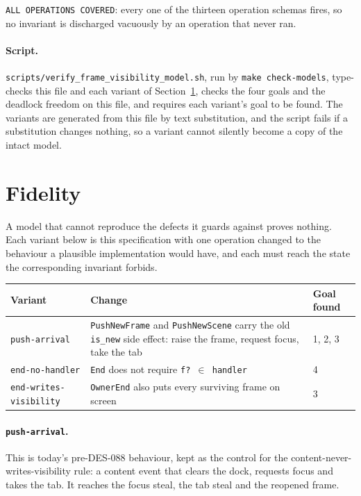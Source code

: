 \documentclass[a4paper,10pt,fleqn]{article}
\begin{document}
\texttt{ALL OPERATIONS COVERED}: every one of the thirteen operation schemas
fires, so no invariant is discharged vacuously by an operation that never
ran.

\paragraph{Script.}\label{sec:script}
\texttt{scripts/verify\_frame\_visibility\_model.sh}, run by
\texttt{make check-models}, type-checks this file and each variant of
Section~\ref{sec:fidelity}, checks the four goals and the deadlock freedom on
this file, and requires each variant's goal to be found.  The variants are
generated from this file by text substitution, and the script fails if a
substitution changes nothing, so a variant cannot silently become a copy of
the intact model.

\section{Fidelity}
\label{sec:fidelity}

A model that cannot reproduce the defects it guards against proves nothing.
Each variant below is this specification with one operation changed to the
behaviour a plausible implementation would have, and each must reach the
state the corresponding invariant forbids.

\begin{center}
\begin{tabular}{lll}
  \textbf{Variant} & \textbf{Change} & \textbf{Goal found} \\
  \hline
  \texttt{push-arrival} & \texttt{PushNewFrame} and \texttt{PushNewScene}
    carry the old \texttt{is\_new} side effect: raise the frame,
    request focus, take the tab & 1, 2, 3 \\
  \texttt{end-no-handler} & \texttt{End} does not require
    \texttt{f? $\in$ handler} & 4 \\
  \texttt{end-writes-visibility} & \texttt{OwnerEnd} also puts every
    surviving frame on screen & 3 \\
\end{tabular}
\end{center}

\paragraph{\texttt{push-arrival}.}  This is today's pre-DES-088 behaviour,
kept as the control for the content-never-writes-visibility rule: a content
event that clears the dock, requests focus and takes the tab.  It reaches the
focus steal, the tab steal and the reopened frame.
\end{document}
